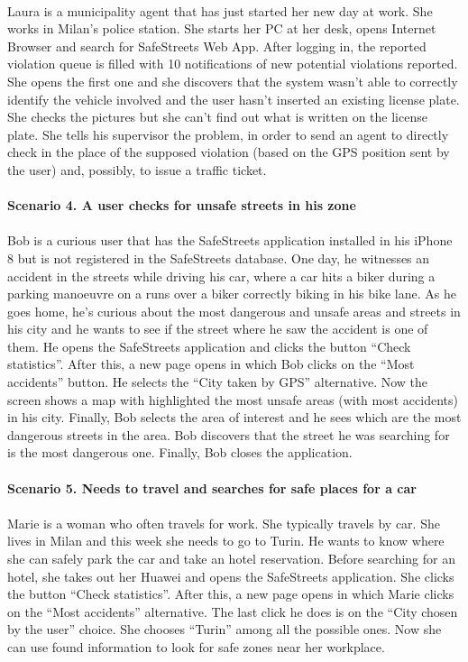 \documentclass[a4paper]{report}
\begin{document}
\\
Laura is a municipality agent that has just started her new day at work. She works in Milan's police station. She starts her PC at her desk, opens Internet Browser and search for SafeStreets Web App. After logging in, the reported violation queue is filled with 10 notifications of new potential violations reported. She opens the first one and she discovers that the system wasn't able to correctly identify the vehicle involved and the user hasn't inserted an existing license plate. She checks the pictures but she can't find out what is written on the license plate. She tells his supervisor the problem, in order to send an agent to directly check in the place of the supposed violation (based on the GPS position sent by the user) and, possibly, to issue a traffic ticket.
\\
\\
\textbf{Scenario 4. A user checks for unsafe streets in his zone}\\
\\
Bob is a curious user that has the SafeStreets application installed in his iPhone 8 but is not registered in the SafeStreets database. One day, he witnesses an accident in the streets while driving his car, where a car hits a biker during a parking manoeuvre on a runs over a biker correctly biking in his bike lane.
As he goes home, he’s curious about the most dangerous and unsafe areas and streets in his city and he wants to see if the street where he saw the accident is one of them. He opens the SafeStreets application and clicks the button “Check statistics”. After this, a new page opens in which Bob clicks on the “Most accidents” button. He selects the “City taken by GPS” alternative. Now the screen shows a map with highlighted the most unsafe areas (with most accidents) in his city. Finally, Bob selects  the area of interest and he sees which are the most dangerous streets in the area. Bob discovers that the street he was searching for is the most dangerous one. Finally, Bob closes the application.
\\
\\
\textbf{Scenario 5. Needs to travel and searches for safe places for a car}\\
\\
Marie is a woman who often travels for work. She typically travels by car. She lives in Milan and this week she needs to go to Turin. He wants to know where she can safely park the car and take an hotel reservation. Before searching for an hotel, she takes out her Huawei and opens the SafeStreets application. She clicks the button “Check statistics”. After this, a new page opens in which Marie clicks on the “Most accidents” alternative. The last click he does is on the “City  chosen by the user” choice. She chooses “Turin” among all the possible ones. Now she can use found information to look for safe zones near her workplace.
\end{document}
